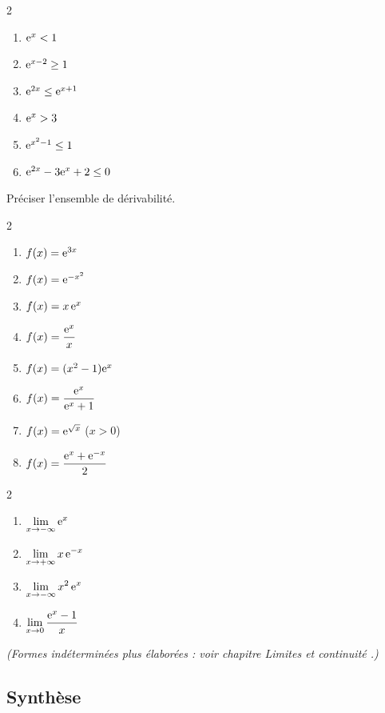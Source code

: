 \begin{multicols}{2}
\begin{enumerate}
	\item $\mathrm{e}^{x}<1$
	\item $\mathrm{e}^{x-2}\geq 1$
	\item $\mathrm{e}^{2x}\leq\mathrm{e}^{x+1}$
	\item $\mathrm{e}^{x}>3$
	\item $\mathrm{e}^{x^{2}-1}\leq 1$
	\item $\mathrm{e}^{2x}-3\mathrm{e}^{x}+2\leq 0$
\end{enumerate}
\end{multicols}

Préciser l'ensemble de dérivabilité.
\begin{multicols}{2}
\begin{enumerate}
	\item $f(x)=\mathrm{e}^{3x}$
	\item $f(x)=\mathrm{e}^{-x^{2}}$
	\item $f(x)=x\,\mathrm{e}^{x}$
	\item $f(x)=\dfrac{\mathrm{e}^{x}}{x}$
	\item $f(x)=(x^{2}-1)\mathrm{e}^{x}$
	\item $f(x)=\dfrac{\mathrm{e}^{x}}{\mathrm{e}^{x}+1}$
	\item $f(x)=\mathrm{e}^{\sqrt{x}}$ \; ($x>0$)
	\item $f(x)=\dfrac{\mathrm{e}^{x}+\mathrm{e}^{-x}}{2}$
\end{enumerate}
\end{multicols}

\begin{multicols}{2}
\begin{enumerate}
	\item $\displaystyle\lim_{x\to-\infty}\mathrm{e}^{x}$
	\item $\displaystyle\lim_{x\to+\infty}x\,\mathrm{e}^{-x}$
	\item $\displaystyle\lim_{x\to-\infty}x^{2}\,\mathrm{e}^{x}$
	\item $\displaystyle\lim_{x\to 0}\dfrac{\mathrm{e}^{x}-1}{x}$
\end{enumerate}
\end{multicols}
\emph{(Formes indéterminées plus élaborées : voir chapitre
\og Limites et continuité \fg.)}

\subsection{Synthèse}

